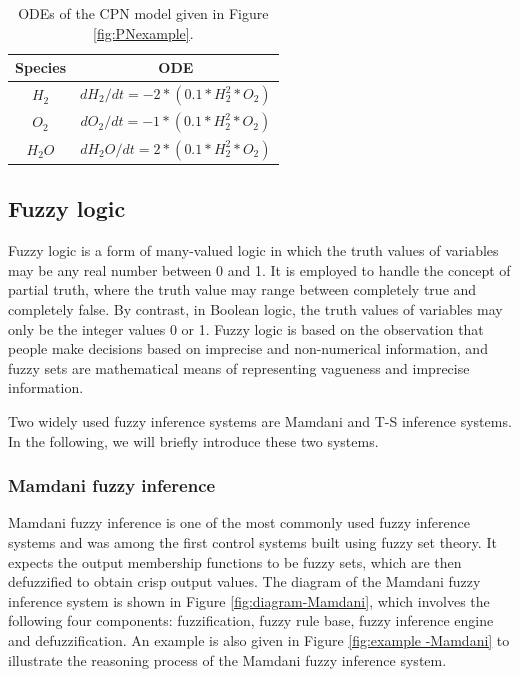 \documentclass[journal,a4paper,onecolumn]{article}
\begin{document}
\begin{table}[!hbt]
	\begin{center}
		\caption{ODEs of the CPN model given in Figure \ref{fig:PNexample}.}
		\label{tab:ODEs-PN}
		\begin{tabular}{|c|c|}
			\hline
			Species&ODE\\
			\hline
			$H_2$&$dH_2/dt=-2*(0.1*H_2^2*O_2)$\\
			\hline
			$O_2$&$dO_2/dt=-1*(0.1*H_2^2*O_2)$\\
			\hline
			$H_2O$&$dH_2O/dt=2*(0.1*H_2^2*O_2)$\\
			\hline
		\end{tabular}
	\end{center}
\end{table}


\subsection{Fuzzy logic}
Fuzzy logic \cite{Zad65,WRK07} is a form of many-valued logic in which the truth values of variables may be any real number between 0 and 1. It is employed to handle the concept of partial truth, where the truth value may range between completely true and completely false. By contrast, in Boolean logic, the truth values of variables may only be the integer values 0 or 1. Fuzzy logic is based on the observation that people make decisions based on imprecise and non-numerical information, and fuzzy sets are mathematical means of representing vagueness and imprecise information. 

Two widely used fuzzy inference systems are Mamdani and T-S inference systems.
In the following, we will briefly introduce these two systems.




\subsubsection{Mamdani fuzzy inference}
Mamdani fuzzy inference \cite{Mamdani74} is one of the most commonly used fuzzy inference systems and was among the first control systems built using fuzzy set theory. It expects the output membership functions to be fuzzy sets, which are then defuzzified to obtain crisp output values. The diagram of the Mamdani fuzzy inference system is shown in Figure \ref{fig:diagram-Mamdani}, which involves the following four components: fuzzification, fuzzy rule base, fuzzy inference engine and defuzzification. An example is also given in Figure \ref{fig:example -Mamdani} to illustrate the reasoning process of the Mamdani fuzzy inference system.
\end{document}
